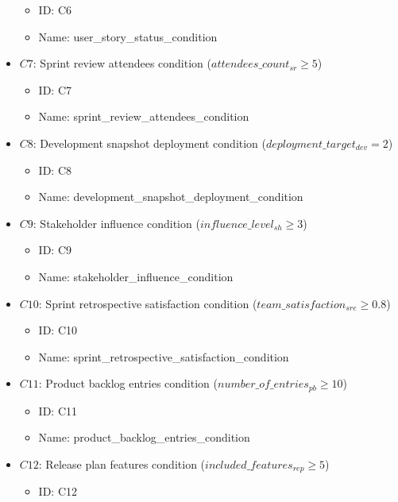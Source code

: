 \documentclass{article}
\begin{document}
\begin{itemize}
        \begin{itemize}
            \item ID: C6
            \item Name: user\_story\_status\_condition
        \end{itemize}
    \item $C7$: Sprint review attendees condition ($attendees\_count_{sr} \geq 5$)
        \begin{itemize}
            \item ID: C7
            \item Name: sprint\_review\_attendees\_condition
        \end{itemize}
    \item $C8$: Development snapshot deployment condition ($deployment\_target_{dev} = 2$)
        \begin{itemize}
            \item ID: C8
            \item Name: development\_snapshot\_deployment\_condition
        \end{itemize}
    \item $C9$: Stakeholder influence condition ($influence\_level_{sh} \geq 3$)
        \begin{itemize}
            \item ID: C9
            \item Name: stakeholder\_influence\_condition
        \end{itemize}
    \item $C10$: Sprint retrospective satisfaction condition ($team\_satisfaction_{sre} \geq 0.8$)
        \begin{itemize}
            \item ID: C10
            \item Name: sprint\_retrospective\_satisfaction\_condition
        \end{itemize}
    \item $C11$: Product backlog entries condition ($number\_of\_entries_{pb} \geq 10$)
        \begin{itemize}
            \item ID: C11
            \item Name: product\_backlog\_entries\_condition
        \end{itemize}
    \item $C12$: Release plan features condition ($included\_features_{rep} \geq 5$)
        \begin{itemize}
            \item ID: C12

\end{itemize}
\end{itemize}
\end{document}
